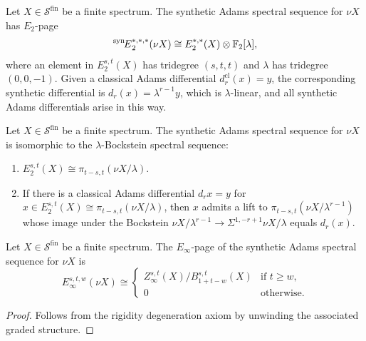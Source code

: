 \begin{axiom}\label{prereq:ax:rigid}
    \leanok
    Let $X \in \mathcal{S}^{\mathrm{fin}}$ be a finite spectrum. The synthetic Adams spectral sequence for $\nu X$ has $E_2$-page
    $$\prescript{\mathrm{syn}\!}{}{E}_2^{*,*,*}(\nu X) \cong E_2^{*,*}(X) \otimes {\mathbb F}_2[\lambda],$$
    where an element in $E_2^{s,t}(X)$ has tridegree $(s,t,t)$ and $\lambda$ has tridegree $(0,0,-1)$. Given a classical Adams differential $d_r^{\mathrm{cl}}(x) = y$, the corresponding synthetic differential is $d_r(x) = \lambda^{r-1}y$, which is $\lambda$-linear, and all synthetic Adams differentials arise in this way.
\end{axiom}

\begin{axiom}\label{prereq:ax:lambda-bockstein}
    \leanok
    Let $X \in \mathcal{S}^{\mathrm{fin}}$ be a finite spectrum. The synthetic Adams spectral sequence for $\nu X$ is isomorphic to the $\lambda$-Bockstein spectral sequence:
    \begin{enumerate}
        \item $E_2^{s,t}(X) \cong \pi_{t-s,t}(\nu X / \lambda)$.
        \item If there is a classical Adams differential $d_r x = y$ for $x \in E_2^{s,t}(X) \cong \pi_{t-s,t}(\nu X / \lambda)$, then $x$ admits a lift to $\pi_{t-s,t}(\nu X / \lambda^{r-1})$ whose image under the Bockstein $\nu X / \lambda^{r-1} \to \Sigma^{1,-r+1} \nu X / \lambda$ equals $d_r(x)$.
    \end{enumerate}
\end{axiom}

\begin{proposition}\label{prereq:prop:syn-einfty-nuX}
    \leanok
    Let $X \in \mathcal{S}^{\mathrm{fin}}$ be a finite spectrum. The $E_\infty$-page of the synthetic Adams spectral sequence for $\nu X$ is
    $$E_\infty^{s,t,w}(\nu X) \cong \begin{cases}
        Z_\infty^{s,t}(X) / B_{1+t-w}^{s,t}(X) & \text{if } t \ge w, \\
        0 & \text{otherwise}.
    \end{cases}$$
\end{proposition}
\begin{proof} Follows from the rigidity degeneration axiom by unwinding the associated graded structure.  %
\end{proof}

